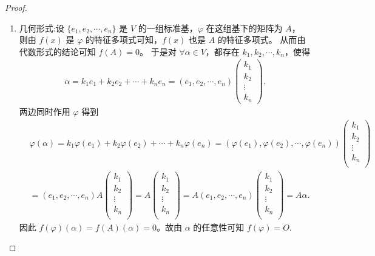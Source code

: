 \documentclass[lang=cn,newtx,10pt,scheme=chinese]{elegantbook}
\begin{document}
\begin{proof}
\begin{enumerate}
\item {\heiti 几何形式:}设 $\{ e_1,e_2,\cdots ,e_n \}$ 是 $V$ 的一组标准基，$\varphi$ 在这组基下的矩阵为 $A$，  
则由 $f(x)$ 是 $\varphi$ 的特征多项式可知，$f(x)$ 也是 $A$ 的特征多项式。  
从而由代数形式的结论可知 $f(A) = 0$。  
于是对 $\forall \alpha \in V$，都存在 $k_1,k_2,\cdots ,k_n$，使得  
\begin{align*}
\alpha = k_1e_1+k_2e_2+\cdots +k_ne_n 
= \left( e_1,e_2,\cdots ,e_n \right) \begin{pmatrix}
k_1\\
k_2\\
\vdots\\
k_n
\end{pmatrix}.
\end{align*}
两边同时作用 $\varphi$ 得到  
\begin{align*}
&\varphi \left( \alpha \right) =k_1\varphi \left( e_1 \right) +k_2\varphi \left( e_2 \right) +\cdots +k_n\varphi \left( e_n \right) =\left( \varphi \left( e_1 \right) ,\varphi \left( e_2 \right) ,\cdots ,\varphi \left( e_n \right) \right) \left( \begin{array}{c}
k_1\\
k_2\\
\vdots\\
k_n\\
\end{array} \right) 
\\
&=\left( e_1,e_2,\cdots ,e_n \right) A\left( \begin{array}{c}
k_1\\
k_2\\
\vdots\\
k_n\\
\end{array} \right) =A\left( \begin{array}{c}
k_1\\
k_2\\
\vdots\\
k_n\\
\end{array} \right) =A\left( e_1,e_2,\cdots ,e_n \right) \left( \begin{array}{c}
k_1\\
k_2\\
\vdots\\
k_n\\
\end{array} \right) =A\alpha .
\end{align*}
因此 $f(\varphi)(\alpha) = f(A)(\alpha) = 0$。故由 $\alpha$ 的任意性可知 $f(\varphi) = O$.
\end{enumerate}
\end{proof}
\end{document}
